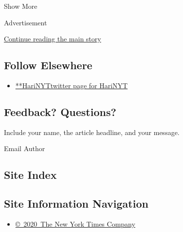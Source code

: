 Show More

Advertisement

\protect\hyperlink{after-mid2}{Continue reading the main story}

\hypertarget{follow-elsewhere}{%
\subsection{Follow Elsewhere}\label{follow-elsewhere}}

\begin{itemize}
\tightlist
\item
  \href{https://twitter.com/HariNYT}{**HariNYTtwitter page for HariNYT}
\end{itemize}

\hypertarget{feedback-questions}{%
\subsection{Feedback? Questions?}\label{feedback-questions}}

Include your name, the article headline, and your message.

Email Author

\hypertarget{site-index}{%
\subsection{Site Index}\label{site-index}}

\hypertarget{site-information-navigation}{%
\subsection{Site Information
Navigation}\label{site-information-navigation}}

\begin{itemize}
\tightlist
\item
  \href{https://help.nytimes.com/hc/en-us/articles/115014792127-Copyright-notice}{©~2020~The
  New York Times Company}
\end{itemize}

